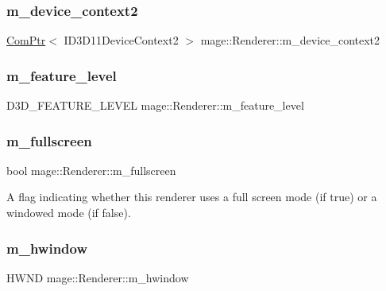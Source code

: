 \subsubsection{\texorpdfstring{m\+\_\+device\+\_\+context2}{m\_device\_context2}}
{\footnotesize\ttfamily \hyperlink{namespacemage_ae74f374780900893caa5555d1031fd79}{Com\+Ptr}$<$ I\+D3\+D11\+Device\+Context2 $>$ mage\+::\+Renderer\+::m\+\_\+device\+\_\+context2\hspace{0.3cm}{\ttfamily [protected]}}

\hypertarget{classmage_1_1_renderer_aa97b108ef58f7d41ddb527f6ba2bfdf9}{}\label{classmage_1_1_renderer_aa97b108ef58f7d41ddb527f6ba2bfdf9} 
\subsubsection{\texorpdfstring{m\+\_\+feature\+\_\+level}{m\_feature\_level}}
{\footnotesize\ttfamily D3\+D\+\_\+\+F\+E\+A\+T\+U\+R\+E\+\_\+\+L\+E\+V\+EL mage\+::\+Renderer\+::m\+\_\+feature\+\_\+level\hspace{0.3cm}{\ttfamily [protected]}}

\hypertarget{classmage_1_1_renderer_a72bb88b17491bd388460afae9d207b0a}{}\label{classmage_1_1_renderer_a72bb88b17491bd388460afae9d207b0a} 
\subsubsection{\texorpdfstring{m\+\_\+fullscreen}{m\_fullscreen}}
{\footnotesize\ttfamily bool mage\+::\+Renderer\+::m\+\_\+fullscreen\hspace{0.3cm}{\ttfamily [private]}}

A flag indicating whether this renderer uses a full screen mode (if {\ttfamily true}) or a windowed mode (if {\ttfamily false}). \hypertarget{classmage_1_1_renderer_afc314c8b146c3709edfd5349257a8387}{}\label{classmage_1_1_renderer_afc314c8b146c3709edfd5349257a8387} 
\subsubsection{\texorpdfstring{m\+\_\+hwindow}{m\_hwindow}}
{\footnotesize\ttfamily H\+W\+ND mage\+::\+Renderer\+::m\+\_\+hwindow\hspace{0.3cm}{\ttfamily [private]}}

